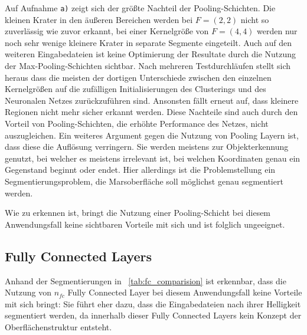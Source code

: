Auf Aufnahme \texttt{a)} zeigt sich der größte Nachteil der Pooling-Schichten. Die kleinen Krater in den äußeren Bereichen werden bei $F=(2, 2)$ nicht so zuverlässig wie zuvor erkannt, bei einer Kernelgröße von $F=(4, 4)$ werden nur noch sehr wenige kleinere Krater in separate Segmente eingeteilt. Auch auf den weiteren Eingabedateien ist keine Optimierung der Resultate durch die Nutzung der Max-Pooling-Schichten sichtbar. Nach mehreren Testdurchläufen stellt sich heraus dass die meisten der dortigen Unterschiede zwischen den einzelnen Kernelgrößen auf die zufälligen Initialisierungen des Clusterings und des Neuronalen Netzes zurückzuführen sind. Ansonsten fällt erneut auf, dass kleinere Regionen nicht mehr sicher erkannt werden. Diese Nachteile sind auch durch den Vorteil von Pooling-Schichten, die erhöhte Performance des Netzes, nicht auszugleichen. Ein weiteres Argument gegen die Nutzung von Pooling Layern ist, dass diese die Auflösung verringern. Sie werden meistens zur Objekterkennung genutzt, bei welcher es meistens irrelevant ist, bei welchen Koordinaten genau ein Gegenstand beginnt oder endet. Hier allerdings ist die Problemstellung ein Segmentierungsproblem, die Marsoberfläche soll möglichst genau segmentiert werden.


Wie zu erkennen ist, bringt die Nutzung einer Pooling-Schicht bei diesem Anwendungsfall keine sichtbaren Vorteile mit sich und ist folglich ungeeignet.

\subsection{Fully Connected Layers}
\label{ssec:exp_fully_connected}

Anhand der Segmentierungen in \tablename~\ref{tab:fc_comparision} ist erkennbar, dass die Nutzung von $n_{fc}$ Fully Connected Layer bei diesem Anwendungsfall keine Vorteile mit sich bringt: Sie führt eher dazu, dass die Eingabedateien nach ihrer Helligkeit segmentiert werden, da innerhalb dieser Fully Connected Layers kein Konzept der Oberflächenstruktur entsteht.


